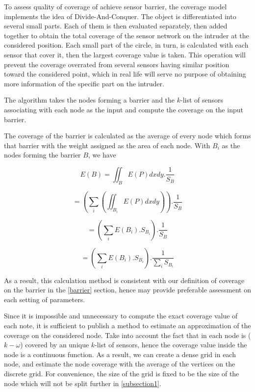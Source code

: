 To assess quality of coverage of achieve sensor barrier, the coverage model implements the idea of Divide-And-Conquer. The object is differentiated into several small parts. Each of them is then evaluated separately, then added together to obtain the total coverage of the sensor network on the intruder at the considered position. Each small part of the circle, in turn, is calculated with each sensor that cover it, then the largest coverage value is taken. This operation will prevent the coverage overrated from several sensors having similar position toward the considered point, which in real life will serve no purpose of obtaining more information of the specific part on the intruder. 

The algorithm takes the nodes forming a barrier and the $k$-list of sensors associating with each node as the input and compute the coverage on the input barrier.

The coverage of the barrier is calculated as the average of every node which forms that barrier with the weight assigned as the area of each node. With $B_i$ as the nodes forming the barrier $B$, we have

$$E(B) = \iint_{B}E(P)dxdy.\frac{1}{S_B}$$

$$= (\sum_i(\iint_{B_i}E(P)dxdy)).\frac{1}{S_B}$$

$$=(\sum_iE(B_i).S_{B_i}).\frac{1}{S_B} $$

$$=(\sum_iE(B_i).S_{B_i}).\frac{1}{\sum_iS_{B_i}}$$

As a result, this calculation method is consistent with our definition of coverage on the barrier in the \ref{barrier} section, hence may provide preferable assessment on each setting of parameters.

Since it is impossible and unnecessary to compute the exact coverage value of each note, it is sufficient to publish a method to estimate an approximation of the coverage on the considered node. Take into account the fact that in each node is ($k-\omega$) covered by an unique $k$-list of sensors, hence the coverage value inside the node is a continuous function. As a result, we can create a dense grid in each node, and estimate the node coverage with the average of the vertices on the discrete grid. For convenience, the size of the grid is fixed to be the size of the node which will not be split further in \ref{subsection1}.